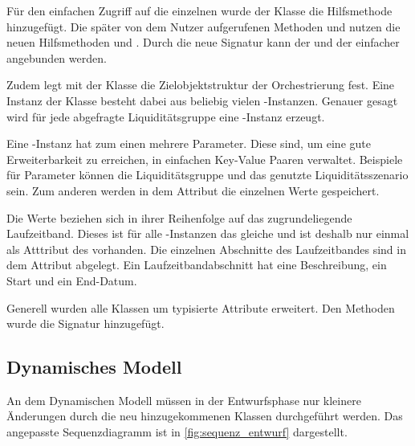 \begin{onehalfspacing}
Für den einfachen Zugriff auf die einzelnen  wurde der Klasse  die Hilfsmethode  hinzugefügt. Die später von dem Nutzer aufgerufenen Methoden  und  nutzen die neuen Hilfsmethoden  und . Durch die neue Signatur kann der  und der  einfacher angebunden werden.


\label{sec:entwurf:statisch:orchestratorresult}
Zudem legt mit der Klasse  die Zielobjektstruktur der Orchestrierung fest. Eine Instanz der Klasse  besteht dabei aus beliebig vielen -Instanzen. Genauer gesagt wird für jede abgefragte Liquiditätsgruppe eine -Instanz erzeugt.

Eine -Instanz hat zum einen mehrere Parameter. Diese sind, um eine gute Erweiterbarkeit zu erreichen, in einfachen Key-Value Paaren verwaltet. Beispiele für Parameter können die Liquiditätsgruppe und das genutzte Liquiditätsszenario sein. Zum anderen werden in dem Attribut  die einzelnen Werte gespeichert.

Die Werte beziehen sich in ihrer Reihenfolge auf das zugrundeliegende Laufzeitband. Dieses ist für alle -Instanzen das gleiche und ist deshalb nur einmal als Atttribut des  vorhanden. Die einzelnen Abschnitte des Laufzeitbandes sind in dem Attribut  abgelegt. Ein Laufzeitbandabschnitt hat eine Beschreibung, ein Start und ein End-Datum.

Generell wurden alle Klassen um typisierte Attribute erweitert. Den Methoden wurde die Signatur hinzugefügt.

\subsection{Dynamisches Modell}

An dem Dynamischen Modell müssen in der Entwurfsphase nur kleinere Änderungen durch die neu hinzugekommenen Klassen durchgeführt werden. Das angepasste Sequenzdiagramm ist in \vref{fig:sequenz_entwurf} dargestellt.


\end{onehalfspacing}
